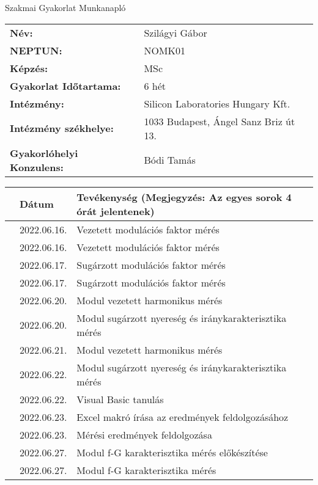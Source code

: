 \documentclass[10pt,a4paper,oneside]{report}
\newcounter{magicrownumbers}
\newcommand\rownum{\stepcounter{magicrownumbers}\arabic{magicrownumbers}}
\begin{document}
\begin{center}
	\Large{Szakmai Gyakorlat Munkanapló}
\end{center}
\begin{tabular}{p{} p{}}
	\textbf{Név:} & Szilágyi Gábor \\
	\textbf{NEPTUN:} & NOMK01 \\
	\textbf{Képzés:} & MSc \\
	\textbf{Gyakorlat Időtartama:} & 6 hét\\
	\textbf{Intézmény:} & Silicon Laboratories Hungary Kft.\\
	\textbf{Intézmény székhelye:} & 1033 Budapest, Ángel Sanz Briz út 13. \\
	\textbf{Gyakorlóhelyi Konzulens:} & Bódi Tamás
\end{tabular}
\begin{table}[h!]
	\centering
	\small
	\begin{tabular}{| c | p{3 cm} | p{10 cm} |}
	\hline
	 & Dátum & Tevékenység (Megjegyzés: Az egyes sorok 4 órát jelentenek) \\ \hline \hline
	\rownum & 2022.06.16. & Vezetett modulációs faktor mérés \\ \hline
	\rownum & 2022.06.16. & Vezetett modulációs faktor mérés \\ \hline
	\rownum & 2022.06.17. & Sugárzott modulációs faktor mérés \\ \hline
	\rownum & 2022.06.17. & Sugárzott modulációs faktor mérés \\ \hline
	\rownum & 2022.06.20. & Modul vezetett harmonikus mérés \\ \hline
	\rownum & 2022.06.20. & Modul sugárzott nyereség és iránykarakterisztika mérés  \\ \hline
	\rownum & 2022.06.21. & Modul vezetett harmonikus mérés \\ \hline
	\rownum & 2022.06.22. & Modul sugárzott nyereség és iránykarakterisztika mérés \\ \hline
	\rownum & 2022.06.22. & Visual Basic tanulás \\ \hline
	\rownum & 2022.06.23. & Excel makró írása az eredmények feldolgozásához \\ \hline
	\rownum & 2022.06.23. & Mérési eredmények feldolgozása \\ \hline
	\rownum & 2022.06.27. & Modul f-G karakterisztika mérés előkészítése \\ \hline
	\rownum & 2022.06.27. & Modul f-G karakterisztika mérés \\ \hline

\end{tabular}
\end{table}
\end{document}
